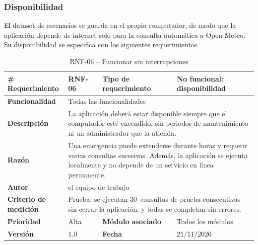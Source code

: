 \subsubsection{Disponibilidad}%
\textcolor{black}{El dataset de escenarios} se guarda en el propio computador, de modo que la aplicación depende de internet solo para la consulta automática a Open-Meteo. Su disponibilidad se especifica con los siguientes requerimientos.

\begin{longtable}{|p{\rqA}|p{\rqB}|p{\rqC}|p{\rqD}|}
  \caption{RNF-06 -- Funcionar sin interrupciones}\label{tab:rnf-06}\tabularnewline
  \hline
  \textbf{\# Requerimiento} & RNF-06 & \raggedright\textbf{Tipo de requerimiento} & No funcional: disponibilidad\tabularnewline\hline
  \raggedright\textbf{Funcionalidad} & \multicolumn{3}{p{\rqBCD}|}{Todas las funcionalidades}\tabularnewline\hline
  \endfirsthead
  \textbf{Descripción} & \multicolumn{3}{p{\rqBCD}|}{La aplicación deberá estar disponible siempre que el computador esté encendido, sin periodos de mantenimiento ni un administrador que la atienda.}\tabularnewline\hline
  \textbf{Razón} & \multicolumn{3}{p{\rqBCD}|}{Una emergencia puede extenderse durante horas y requerir varias consultas sucesivas. Además, la aplicación se ejecuta localmente y no depende de un servicio en línea permanente.}\tabularnewline\hline
  \textbf{Autor} & \multicolumn{3}{p{\rqBCD}|}{el equipo de trabajo}\tabularnewline\hline
  \raggedright\textbf{Criterio de medición} & \multicolumn{3}{p{\rqBCD}|}{Prueba: se ejecutan 30~consultas de prueba consecutivas~\cite{vitoriano2021probabilidad} sin cerrar la aplicación, y todas se completan sin errores.}\tabularnewline\hline
  \textbf{Prioridad} & Alta & \raggedright\textbf{Módulo asociado} & Todos los módulos\tabularnewline\hline
  \textbf{Versión} & 1.0 & \textbf{Fecha} & 21/11/2026\tabularnewline\hline
\end{longtable}

